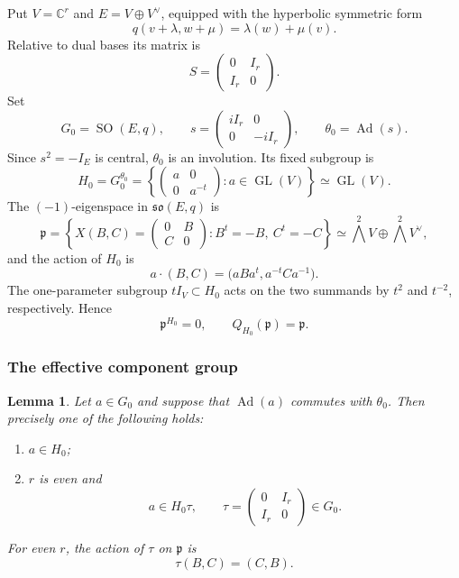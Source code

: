 \documentclass[10pt,a4paper]{amsart}
\numberwithin{equation}{section}
\newtheorem{lemma}[theorem]{Lemma}
\newcommand{\C}{\mathbb C}
\newcommand{\SO}{\operatorname{SO}}
\newcommand{\GL}{\operatorname{GL}}
\newcommand{\Ad}{\operatorname{Ad}}
\newcommand{\fp}{\mathfrak p}
\newcommand{\wedgeTwo}{\bigwedge^{2}}
\begin{document}
Put $V=\C^r$ and $E=V\oplus V^\vee$, equipped with the hyperbolic symmetric form
\[
  q(v+\lambda,w+\mu)=\lambda(w)+\mu(v).
\]
Relative to dual bases its matrix is
\[
  S=\begin{pmatrix}0&I_r\\ I_r&0\end{pmatrix}.
\]
Set
\[
  G_0=\SO(E,q),\qquad
  s=\begin{pmatrix}iI_r&0\\0&-iI_r\end{pmatrix},\qquad
  \theta_0=\Ad(s).
\]
Since $s^2=-I_E$ is central, $\theta_0$ is an involution.  Its fixed subgroup is
\[
 H_0=G_0^{\theta_0}
 =\left\{\begin{pmatrix}a&0\\0&a^{-t}\end{pmatrix}:a\in\GL(V)\right\}
 \simeq\GL(V).
\]
The $(-1)$-eigenspace in $\mathfrak{so}(E,q)$ is
\begin{equation}\label{diii:eq:pmodel}
 \fp=
 \left\{
   X(B,C)=\begin{pmatrix}0&B\\ C&0\end{pmatrix}:
   B^t=-B,\ C^t=-C
 \right\}
 \simeq\wedgeTwo V\oplus\wedgeTwo V^\vee,
\end{equation}
and the action of $H_0$ is
\begin{equation}\label{diii:eq:Haction}
  a\cdot(B,C)=\bigl(aBa^t,a^{-t}Ca^{-1}\bigr).
\end{equation}
The one-parameter subgroup $tI_V\subset H_0$ acts on the two summands by
$t^2$ and $t^{-2}$, respectively.  Hence
\begin{equation}\label{diii:eq:no-fixed}
  \fp^{H_0}=0,
  \qquad Q_{H_0}(\fp)=\fp.
\end{equation}

\subsubsection{The effective component group}

\begin{lemma}\label{diii:lem:components-SO}
Let $a\in G_0$ and suppose that $\Ad(a)$ commutes with $\theta_0$.  Then precisely one of the following holds:
\begin{enumerate}[label=\textup{(\roman*)}]
  \item $a\in H_0$;
  \item $r$ is even and
  \[
    a\in H_0\tau,
    \qquad
    \tau=\begin{pmatrix}0&I_r\\ I_r&0\end{pmatrix}\in G_0.
  \]
\end{enumerate}
For even $r$, the action of $\tau$ on $\fp$ is
\begin{equation}\label{diii:eq:tauaction}
  \tau(B,C)=(C,B).
\end{equation}
\end{lemma}
\end{document}
